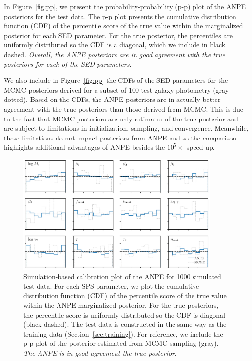 In Figure~\ref{fig:pp}, we present the probability-probability (p-p) plot of
the ANPE posteriors for the test data. 
The p-p plot presents the cumulative distribution function (CDF) of the
percentile score of the true value within the marginalized posterior for each
SED parameter. 
For the true posterior, the percentiles are uniformly distributed so the CDF
is a diagonal, which we include in black dashed.
\emph{Overall, the ANPE posteriors are in good agreement with the true
posteriors for each of the SED parameters}.

We also include in Figure~\ref{fig:pp} the CDFs of the SED parameters for the
MCMC posteriors derived for a subset of 100 test galaxy photometry (gray
dotted). 
Based on the CDFs, the ANPE posteriors are in actually better agreement with
the true posteriors than those derived from MCMC.
This is due to the fact that MCMC posteriors are only estimates of the true
posterior and are subject to limitations in initialization, sampling, and
convergence.
Meanwhile, these limitations do not impact posteriors from ANPE and so the
comparison highlights additional advantages of ANPE besides the $10^5\times$
speed up.

\begin{figure}
\begin{center}
    \includegraphics[width=0.9\textwidth]{figs/sbc.pdf}
    \caption{\label{fig:sbc}
    Simulation-based calibration plot of the ANPE for 1000 simulated test data. 
    For each SPS parameter, we plot the cumulative distribution function (CDF) of the
    percentile score of the true value within the ANPE marginalized posterior.
    For the true posteriors, the percentile score is uniformly distributed so
    the CDF is diagonal (black dashed).
    The test data is constructed in the same way as the training data
    (Section~\ref{sec:training}). 
    For reference, we include the p-p plot of the posterior estimated from MCMC
    sampling (gray). 
    \emph{The ANPE is in good agreement the true posterior.}
    }
\end{center}
\end{figure}

